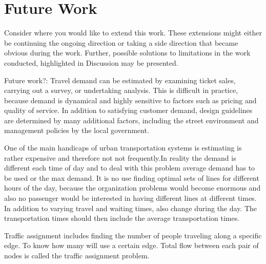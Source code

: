 \section{Future Work}

Consider where you would like to extend this work. These extensions might either be continuing the ongoing direction or taking a side direction that became obvious during the work. Further, possible solutions to limitations in the work conducted, highlighted in Discussion may be presented.

Future work?: Travel demand can be estimated by examining ticket sales, carrying out a survey, or undertaking analysis. This is difficult in practice, because demand is dynamical and highly sensitive to factors such as pricing and quality of service. In addition to satisfying customer demand, design guidelines are determined by many additional factors, including the street environment and management policies by the local government\citep{fan09}.

One of the main handicaps of urban transportation systems is estimating is rather expensive and therefore not not frequently.In reality the demand is different each time of day and to deal with this problem average demand has to be used or the max demand. It is no use finding optimal sets of lines for different hours of the day, because the organization problems would become enormous and also no passenger would be interested in having different lines at different times. In addition to varying travel and waiting times, also change during the day. The transportation times should then include the average transportation times. \citep{mandl79}

Traffic assignment includes finding the number of people traveling along a specific edge. 
To know how many will use a certain edge. Total flow between each pair of nodes is called the traffic assignment problem.



